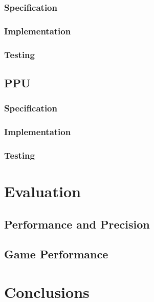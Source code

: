 \documentclass[]{report}
\begin{document}
\subsection{Specification}

\subsection{Implementation}

\subsection{Testing}

\section{PPU}

\subsection{Specification}

\subsection{Implementation}

\subsection{Testing}

\chapter{Evaluation}

\section{Performance and Precision}

\section{Game Performance}

\chapter{Conclusions}

\printbibliography
\end{document}
